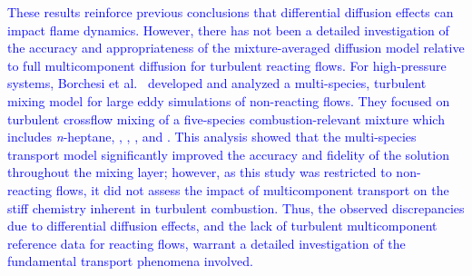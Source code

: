 \documentclass[preprint,review,12pt]{elsarticle}
\begin{document}
\textcolor{blue}{These results reinforce previous conclusions that differential diffusion effects can impact flame dynamics.
However, there has not been a detailed investigation of the accuracy and appropriateness of the mixture-averaged diffusion model relative to full multicomponent diffusion for turbulent reacting flows.
For high-pressure systems, Borchesi et al.~\cite{Borghesi2015iAConditions} developed and analyzed a multi-species, turbulent mixing model for large eddy simulations of non-reacting flows.
They focused on turbulent crossflow mixing of a five-species combustion-relevant mixture which includes \textit{n}-heptane, , , , and .
This analysis showed that the multi-species transport model significantly improved the accuracy and fidelity of the solution throughout the mixing layer; however, as this study was restricted to non-reacting flows, it did not assess the impact of multicomponent transport on the stiff chemistry inherent in turbulent combustion. 
Thus, the observed discrepancies due to differential diffusion effects, and the lack of turbulent multicomponent reference data for reacting flows, warrant a detailed investigation of the fundamental transport phenomena involved.}

%
\end{document}
